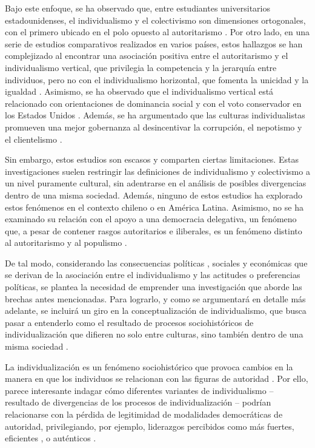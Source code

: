 \documentclass[12pt,twoside]{templates/facsothesis}
\begin{document}
Bajo este enfoque, se ha observado que, entre estudiantes universitarios estadounidenses, el individualismo y el colectivismo son dimensiones ortogonales, con el primero ubicado en el polo opuesto al autoritarismo \citep{gelfand1996}. Por otro lado, en una serie de estudios comparativos realizados en varios países, estos hallazgos se han complejizado al encontrar una asociación positiva entre el autoritarismo y el individualismo vertical, que privilegia la competencia y la jerarquía entre individuos, pero no con el individualismo horizontal, que fomenta la unicidad y la igualdad \citep{kemmelmeier2003}. Asimismo, se ha observado que el individualismo vertical está relacionado con orientaciones de dominancia social \citep{strunk1999} y con el voto conservador en los Estados Unidos \citep{zhang2009}. Además, se ha argumentado que las culturas individualistas promueven una mejor gobernanza al desincentivar la corrupción, el nepotismo y el clientelismo \citep{kyriacou2016}.

Sin embargo, estos estudios son escasos y comparten ciertas limitaciones. Estas investigaciones suelen restringir las definiciones de individualismo y colectivismo a un nivel puramente cultural, sin adentrarse en el análisis de posibles divergencias dentro de una misma sociedad. Además, ninguno de estos estudios ha explorado estos fenómenos en el contexto chileno o en América Latina. Asimismo, no se ha examinado su relación con el apoyo a una democracia delegativa, un fenómeno que, a pesar de contener rasgos autoritarios e iliberales, es un fenómeno distinto al autoritarismo y al populismo \citep{carlin2011, carlin2018}.

De tal modo, considerando las consecuencias políticas \citep{zhang2009}, sociales \citep{strunk1999} y económicas \citep{kyriacou2016} que se derivan de la asociación entre el individualismo y las actitudes o preferencias políticas, se plantea la necesidad de emprender una investigación que aborde las brechas antes mencionadas. Para lograrlo, y como se argumentará en detalle más adelante, se incluirá un giro en la conceptualización de individualismo, que busca pasar a entenderlo como el resultado de procesos sociohistóricos de individualización que difieren no solo entre culturas, sino también dentro de una misma sociedad \citep{martuccelli2018}.

La individualización es un fenómeno sociohistórico que provoca cambios en la manera en que los individuos se relacionan con las figuras de autoridad \citep{araujo2021}. Por ello, parece interesante indagar cómo diferentes variantes de individualismo -- resultado de divergencias de los procesos de individualización -- podrían relacionarse con la pérdida de legitimidad de modalidades democráticas de autoridad, privilegiando, por ejemplo, liderazgos percibidos como más fuertes, eficientes \citep{araujo2022, araujo2022a}, o auténticos \citep{gauthier2021}.
\end{document}
